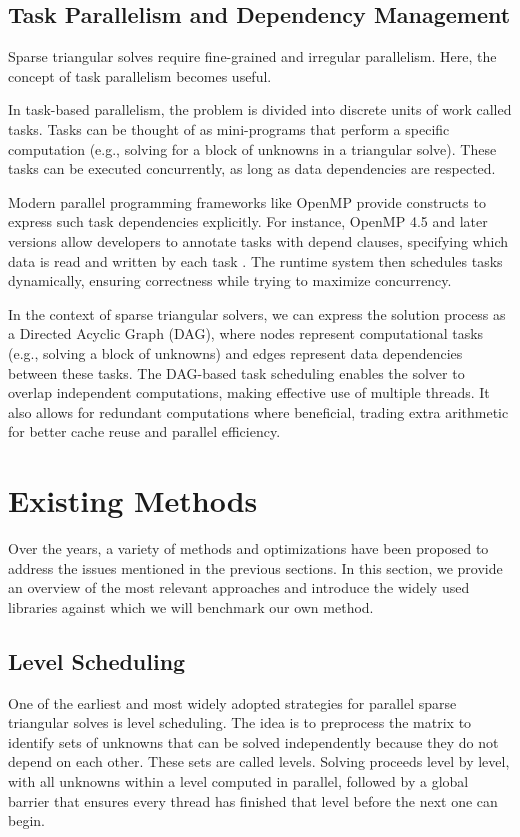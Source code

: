 \subsection{Task Parallelism and Dependency Management}
Sparse triangular solves require fine-grained and irregular parallelism. Here, the concept of task parallelism becomes useful.

In task-based parallelism, the problem is divided into discrete units of work called tasks. Tasks can be thought of as mini-programs that perform a specific computation (e.g., solving for a block of unknowns in a triangular solve). These tasks can be executed concurrently, as long as data dependencies are respected.

Modern parallel programming frameworks like OpenMP provide constructs to express such task dependencies explicitly. For instance, OpenMP 4.5 and later versions allow developers to annotate tasks with depend clauses, specifying which data is read and written by each task \cite{openmp2015programminginterface}. The runtime system then schedules tasks dynamically, ensuring correctness while trying to maximize concurrency.

In the context of sparse triangular solvers, we can express the solution process as a Directed Acyclic Graph (DAG), where nodes represent computational tasks (e.g., solving a block of unknowns) and edges represent data dependencies between these tasks.
The DAG-based task scheduling enables the solver to overlap independent computations, making effective use of multiple threads. It also allows for redundant computations where beneficial, trading extra arithmetic for better cache reuse and parallel efficiency.

\section{Existing Methods}
\label{chap:lr_current_methodes}
Over the years, a variety of methods and optimizations have been proposed to address the issues mentioned in the previous sections. In this section, we provide an overview of the most relevant approaches and introduce the widely used libraries against which we will benchmark our own method.

\subsection{Level Scheduling}
One of the earliest and most widely adopted strategies for parallel sparse triangular solves is level scheduling. The idea is to preprocess the matrix to identify sets of unknowns that can be solved independently because they do not depend on each other. These sets are called levels. Solving proceeds level by level, with all unknowns within a level computed in parallel, followed by a global barrier that ensures every thread has finished that level before the next one can begin.

